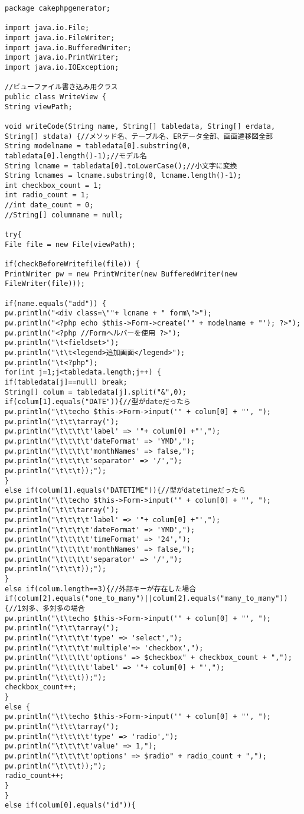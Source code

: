 \documentclass{funthesis}
\begin{document}
\begin{lstlisting}[caption=WriteView.java,label=1]
package cakephpgenerator;

import java.io.File;
import java.io.FileWriter;
import java.io.BufferedWriter;
import java.io.PrintWriter;
import java.io.IOException;

//ビューファイル書き込み用クラス
public class WriteView {
String viewPath;

void writeCode(String name, String[] tabledata, String[] erdata, String[] stdata) {//メソッド名、テーブル名、ERデータ全部、画面遷移図全部
String modelname = tabledata[0].substring(0, tabledata[0].length()-1);//モデル名
String lcname = tabledata[0].toLowerCase();//小文字に変換
String lcnames = lcname.substring(0, lcname.length()-1);
int checkbox_count = 1;
int radio_count = 1;
//int date_count = 0;
//String[] columname = null;

try{
File file = new File(viewPath);

if(checkBeforeWritefile(file)) {
PrintWriter pw = new PrintWriter(new BufferedWriter(new FileWriter(file)));

if(name.equals("add")) {
pw.println("<div class=\""+ lcname + " form\">");
pw.println("<?php echo $this->Form->create('" + modelname + "'); ?>");
pw.println("<?php //Formヘルパーを使用 ?>");
pw.println("\t<fieldset>");
pw.println("\t\t<legend>追加画面</legend>");
pw.println("\t<?php");
for(int j=1;j<tabledata.length;j++) {
if(tabledata[j]==null) break;
String[] colum = tabledata[j].split("&",0);
if(colum[1].equals("DATE")){//型がdateだったら
pw.println("\t\techo $this->Form->input('" + colum[0] + "', ");
pw.println("\t\t\tarray(");
pw.println("\t\t\t\t'label' => '"+ colum[0] +"',");
pw.println("\t\t\t\t'dateFormat' => 'YMD',");
pw.println("\t\t\t\t'monthNames' => false,");
pw.println("\t\t\t\t'separator' => '/',");
pw.println("\t\t\t));");
}
else if(colum[1].equals("DATETIME")){//型がdatetimeだったら
pw.println("\t\techo $this->Form->input('" + colum[0] + "', ");
pw.println("\t\t\tarray(");
pw.println("\t\t\t\t'label' => '"+ colum[0] +"',");
pw.println("\t\t\t\t'dateFormat' => 'YMD',");
pw.println("\t\t\t\t'timeFormat' => '24',");
pw.println("\t\t\t\t'monthNames' => false,");
pw.println("\t\t\t\t'separator' => '/',");
pw.println("\t\t\t));");
}
else if(colum.length==3){//外部キーが存在した場合
if(colum[2].equals("one_to_many")||colum[2].equals("many_to_many")){//1対多、多対多の場合
pw.println("\t\techo $this->Form->input('" + colum[0] + "', ");
pw.println("\t\t\tarray(");
pw.println("\t\t\t\t'type' => 'select',");
pw.println("\t\t\t\t'multiple'=> 'checkbox',");
pw.println("\t\t\t\t'options' => $checkbox" + checkbox_count + ",");
pw.println("\t\t\t\t'label' => '"+ colum[0] + "',");
pw.println("\t\t\t));");
checkbox_count++;
}
else {
pw.println("\t\techo $this->Form->input('" + colum[0] + "', ");
pw.println("\t\t\tarray(");
pw.println("\t\t\t\t'type' => 'radio',");
pw.println("\t\t\t\t'value' => 1,");
pw.println("\t\t\t\t'options' => $radio" + radio_count + ",");
pw.println("\t\t\t));");
radio_count++;
}
}
else if(colum[0].equals("id")){


\end{lstlisting}
\end{document}
